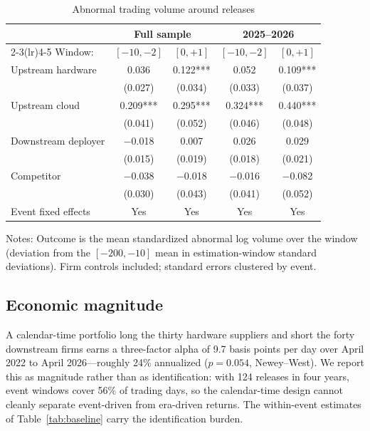 \documentclass[review,12pt,authoryear]{elsarticle}
\begin{document}
\begin{table}[t!]
\centering
\begin{threeparttable}
\caption{Abnormal trading volume around releases}\label{tab:volume}
\small
\begin{tabular}{lcccc}
\toprule
 & \multicolumn{2}{c}{Full sample} & \multicolumn{2}{c}{2025--2026} \\
\cmidrule(lr){2-3}\cmidrule(lr){4-5}
Window: & $[-10,-2]$ & $[0,+1]$ & $[-10,-2]$ & $[0,+1]$ \\
\midrule
Upstream hardware & 0.036 & 0.122*** & 0.052 & 0.109*** \\
                  & (0.027) & (0.034) & (0.033) & (0.037) \\
Upstream cloud    & 0.209*** & 0.295*** & 0.324*** & 0.440*** \\
                  & (0.041) & (0.052) & (0.046) & (0.048) \\
Downstream deployer & $-$0.018 & 0.007 & 0.026 & 0.029 \\
                  & (0.015) & (0.019) & (0.018) & (0.021) \\
Competitor        & $-$0.038 & $-$0.018 & $-$0.016 & $-$0.082 \\
                  & (0.030) & (0.043) & (0.041) & (0.052) \\
\midrule
Event fixed effects & Yes & Yes & Yes & Yes \\
\bottomrule
\end{tabular}
\begin{tablenotes}\footnotesize
\item Notes: Outcome is the mean standardized abnormal log volume over the
window (deviation from the $[-200,-10]$ mean in estimation-window standard
deviations). Firm controls included; standard errors clustered by event.
\end{tablenotes}
\end{threeparttable}
\end{table}

\subsection{Economic magnitude}

A calendar-time portfolio long the thirty hardware suppliers and short the
forty downstream firms earns a three-factor alpha of 9.7 basis points per day
over April 2022 to April 2026---roughly 24\% annualized ($p=0.054$,
Newey--West). We report this as magnitude rather than as identification: with
124 releases in four years, event windows cover 56\% of trading days, so the
calendar-time design cannot cleanly separate event-driven from era-driven
returns. The within-event estimates of Table~\ref{tab:baseline} carry the
identification burden.
\end{document}
